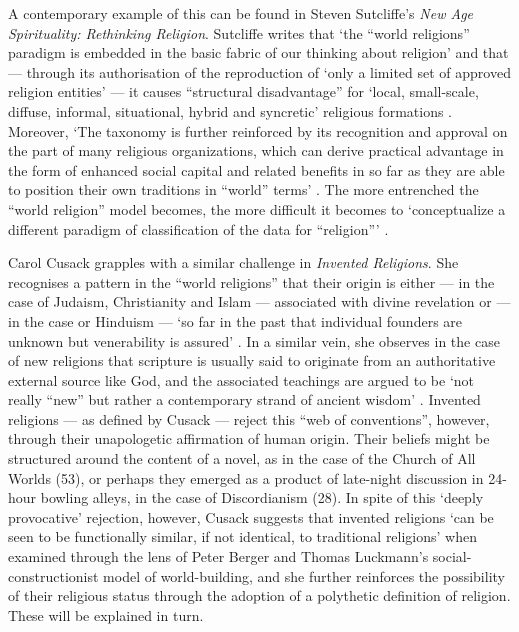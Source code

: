 A contemporary example of this can be found in Steven Sutcliffe's
\textit{New Age Spirituality: Rethinking Religion}.
Sutcliffe writes that `the ``world religions'' paradigm is embedded in the
basic fabric of our thinking about religion' and that --- through its
authorisation of the reproduction of `only a limited set
of approved religion entities' --- it causes ``structural disadvantage'' for
`local, small-scale, diffuse, informal, situational, hybrid and syncretic'
religious formations \parencite[22, 25]{Sutcliffe14}.
Moreover, `The taxonomy is further reinforced by
its recognition and approval on the part of many religious organizations,
which can derive practical advantage in the form of enhanced social capital
and related benefits in so far as they are able to position
their own traditions in ``world'' terms' \parencite[23]{Sutcliffe14}.
The more entrenched the ``world religion'' model becomes,
the more difficult it becomes to `conceptualize a different paradigm
of classification of the data for ``religion''\thinspace'
\parencite[25]{Sutcliffe14}.

Carol Cusack grapples with a similar challenge in \textit{Invented Religions}.
She recognises a pattern in the ``world religions'' that their origin is
either --- in the case of Judaism, Christianity and Islam ---
associated with divine revelation or --- in the case or Hinduism ---
`so far in the past that individual founders are unknown but venerability is
assured' \parencite[1]{Cusack10}.
In a similar vein, she observes in the case of new religions that
scripture is usually said to originate from
an authoritative external source like God, and the associated teachings
are argued to be `not really ``new'' but rather a contemporary
strand of ancient wisdom' \parencite[1]{Cusack10}.
Invented religions --- as defined by Cusack --- reject this
``web of conventions'', however, through their unapologetic affirmation of
human origin.
Their beliefs might be structured around the content of a novel,
as in the case of the Church of All Worlds (53),
or perhaps they emerged as a product of late-night discussion in
24-hour bowling alleys, in the case of Discordianism (28).
In spite of this `deeply provocative' rejection,
however, Cusack suggests that invented religions `can be seen to be
functionally similar, if not identical, to traditional religions'
when examined through the lens of Peter Berger and Thomas Luckmann's
social-constructionist model of world-building, and she further reinforces
the possibility of their religious status through the adoption of a polythetic
definition of religion. These will be explained in turn.

